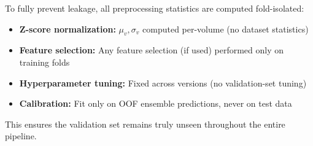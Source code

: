 To fully prevent leakage, all preprocessing statistics are computed fold-isolated:
\begin{itemize}
    \item \textbf{Z-score normalization:} $\mu_v, \sigma_v$ computed per-volume (no dataset statistics)
    \item \textbf{Feature selection:} Any feature selection (if used) performed only on training folds
    \item \textbf{Hyperparameter tuning:} Fixed across versions (no validation-set tuning)
    \item \textbf{Calibration:} Fit only on OOF ensemble predictions, never on test data
\end{itemize}

This ensures the validation set remains truly unseen throughout the entire pipeline.
